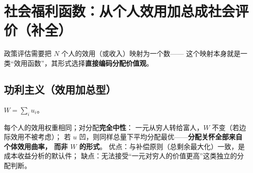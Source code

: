 \section{社会福利函数：从个人效用加总成社会评价（补全）}

政策评估需要把 $N$ 个人的效用（或收入）映射为一个数——
这个映射本身就是一类“效用函数”，其形式选择\textbf{直接编码分配价值观}。

\subsection{功利主义（效用加总型）}

$W=\sum_i u_i$。

每个人的效用权重相同；对分配\textbf{完全中性}：
一元从穷人转给富人，$W$ 不变（若边际效用不被考虑）；
若 $u$ 凹，则同样总量下平均分配最优——\textbf{分配关怀全部来自个体效用曲率，
而非 $W$ 的形式}。
优点：与补偿原则（总剩余最大化）一致，是成本收益分析的默认件；
缺点：无法接受“一元对穷人的价值更高”这类独立的分配判断。

